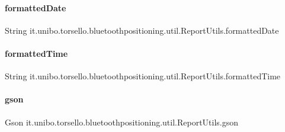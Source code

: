 \paragraph{\texorpdfstring{formatted\+Date}{formattedDate}}
{\footnotesize\ttfamily String it.\+unibo.\+torsello.\+bluetoothpositioning.\+util.\+Report\+Utils.\+formatted\+Date\hspace{0.3cm}{\ttfamily [private]}}

\hypertarget{classit_1_1unibo_1_1torsello_1_1bluetoothpositioning_1_1util_1_1ReportUtils_a6e6b0d302bb7d2e8f128154f0a80965c_a6e6b0d302bb7d2e8f128154f0a80965c}{}\label{classit_1_1unibo_1_1torsello_1_1bluetoothpositioning_1_1util_1_1ReportUtils_a6e6b0d302bb7d2e8f128154f0a80965c_a6e6b0d302bb7d2e8f128154f0a80965c} 
\paragraph{\texorpdfstring{formatted\+Time}{formattedTime}}
{\footnotesize\ttfamily String it.\+unibo.\+torsello.\+bluetoothpositioning.\+util.\+Report\+Utils.\+formatted\+Time\hspace{0.3cm}{\ttfamily [private]}}

\hypertarget{classit_1_1unibo_1_1torsello_1_1bluetoothpositioning_1_1util_1_1ReportUtils_a974d9bac8edb83847a34b20db0299fca_a974d9bac8edb83847a34b20db0299fca}{}\label{classit_1_1unibo_1_1torsello_1_1bluetoothpositioning_1_1util_1_1ReportUtils_a974d9bac8edb83847a34b20db0299fca_a974d9bac8edb83847a34b20db0299fca} 
\paragraph{\texorpdfstring{gson}{gson}}
{\footnotesize\ttfamily Gson it.\+unibo.\+torsello.\+bluetoothpositioning.\+util.\+Report\+Utils.\+gson\hspace{0.3cm}{\ttfamily [private]}}

